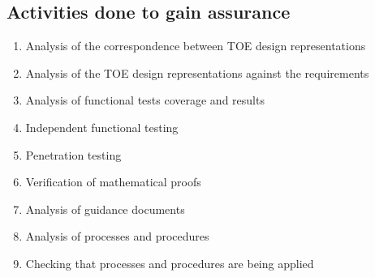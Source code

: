 \subsection{Activities done to gain assurance}
\begin{enumerate}
    \item Analysis of the correspondence between TOE design representations
    \item Analysis of the TOE design representations against the requirements
    \item Analysis of functional tests coverage and results
    \item Independent functional testing
    \item Penetration testing
    \item Verification of mathematical proofs
    \item Analysis of guidance documents
    \item Analysis of processes and procedures
    \item Checking that processes and procedures are being applied
\end{enumerate}